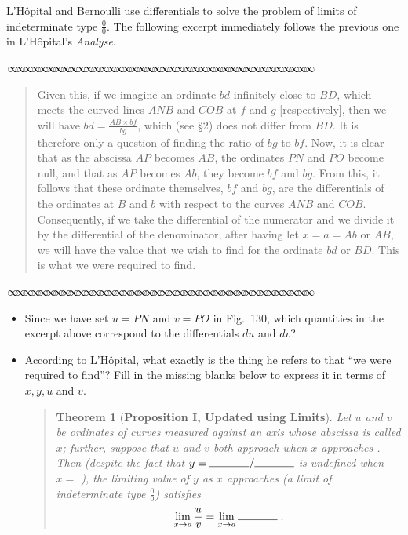 \message{ !name(LHopitalsRule_2021.03.29.tex)}\documentclass[11pt]{article}
\newtheorem*{thm*}{Theorem}
\newcommand{\sep}{\vspace{-3pt}
\begin{center}
{\mathversion{normal}
$\infty \mspace{-5.5mu}\infty \mspace{-5.5mu}\infty \mspace{-5.5mu}\infty \mspace{-5.5mu}
\infty \mspace{-5.5mu}\infty \mspace{-5.5mu}\infty \mspace{-5.5mu}\infty \mspace{-5.5mu}
\infty \mspace{-5.5mu}\infty \mspace{-5.5mu}\infty \mspace{-5.5mu}\infty \mspace{-5.5mu}
\infty \mspace{-5.5mu}\infty \mspace{-5.5mu}\infty \mspace{-5.5mu}\infty \mspace{-5.5mu}
\infty \mspace{-5.5mu}\infty \mspace{-5.5mu}\infty \mspace{-5.5mu}\infty \mspace{-5.5mu}
\infty \mspace{-5.5mu}\infty \mspace{-5.5mu}\infty \mspace{-5.5mu}\infty \mspace{-5.5mu}
\infty \mspace{-5.5mu}\infty \mspace{-5.5mu}\infty \mspace{-5.5mu}\infty \mspace{-5.5mu}
\infty \mspace{-5.5mu}\infty \mspace{-5.5mu}\infty \mspace{-5.5mu}\infty \mspace{-5.5mu}
\infty \mspace{-5.5mu}\infty \mspace{-5.5mu}\infty \mspace{-5.5mu}\infty \mspace{-5.5mu}
\infty \mspace{-5.5mu}\infty \mspace{-5.5mu}\infty \mspace{-5.5mu}\infty \mspace{-5.5mu}$}
\end{center} \vspace*{-5pt}}
\newenvironment{source}%
 {\bigskip \sep \vspace*{-6pt} \begin{quote}
          \begin{sf}   }
   {   \end{sf}     \end{quote} \vspace*{-6pt} \sep \bigskip}%
\newcounter{tasknumb}
\newcommand{\tasknumb}[1]{\refstepcounter{tasknumb}\textmd{\textbf{$\fbox{$\fbox{Task \thetasknumb}$}$}}#1}
\newenvironment{task}[1][]%
 {\begin{itemize}
 \item[\tasknumb{#1}] }
{
    \end{itemize}    }%
\begin{document}
\bigskip
L'H\^opital and Bernoulli use differentials to solve the problem of limits of indeterminate type $\frac00$. The following excerpt immediately follows the previous one in L'H\^opital's \emph{Analyse}.
 
\bigskip
\begin{source}

Given this, if we imagine an ordinate $bd$ infinitely close to $BD$, which meets the curved lines $ANB$ and $COB$ at $f$ and $g$ [respectively], then we will have $bd=\frac{AB \times bf}{bg}$, which (see \S2) does not differ from $BD$. It is therefore only a question of finding the ratio of $bg$ to $bf$. Now, it is clear that as the abscissa $AP$ becomes $AB$, the ordinates $PN$ and $PO$ become null, and that as $AP$ becomes $Ab$, they become $bf$ and $bg$. From this, it follows that these ordinate themselves, $bf$ and $bg$, are the differentials of the ordinates at $B$ and $b$ with respect to the curves $ANB$ and $COB$. Consequently, if we take the differential of the numerator and we divide it by the differential of the denominator, after having let $x=a=Ab$ or $AB$, we will have the value that we wish to find for the ordinate $bd$ or $BD$. This is what we were required to find.

\end{source}

\begin{task}[\label{uv}]
Since we have set $u=PN$ and $v=PO$ in Fig.~130, which quantities in the excerpt above correspond to the differentials $du$ and $dv$?
\end{task}

\begin{task}[\label{updated}]
According to L'H\^opital, what exactly is the thing he refers to that ``we were required to find''? Fill in the missing blanks below to express it in terms of $x, y, u$ and $v$.
\begin{quote}
\begin{thm*}[{\bf Proposition I, Updated using Limits}]
Let $u$ and $v$ be ordinates of curves measured against an axis whose abscissa is called $x$; further, suppose that $u$ and $v$ both approach \makebox[0.5in]{\hrulefill} when $x$ approaches \makebox[0.5in]{\hrulefill}. Then (despite the fact that $y=\makebox[0.5in]{\hrulefill}/\makebox[0.5in]{\hrulefill}$ is undefined when $x=$ \makebox[0.5in]{\hrulefill}), the limiting value of $y$ as $x$ approaches \makebox[0.5in]{\hrulefill} (a limit of indeterminate type ${\displaystyle \frac00}$) satisfies
	\begin{equation}\label{OldRule}
	\lim_{x\to a} \frac{u}{v}=\lim_{x\to a} \makebox[0.5in]{\hrulefill}\;.
	\end{equation}
\end{thm*}
\end{quote}
\end{task}
\end{document}
